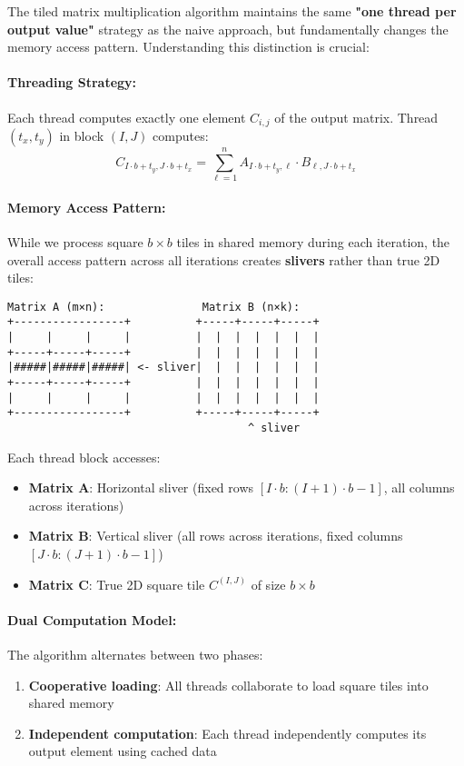 \documentclass{amsbook}
\theoremstyle{definition}
\begin{document}
The tiled matrix multiplication algorithm maintains the same \textbf{"one thread per output value"} strategy as the naive approach, but fundamentally changes the memory access pattern. Understanding this distinction is crucial:

\paragraph{Threading Strategy:} Each thread computes exactly one element $C_{i,j}$ of the output matrix. Thread $(t_x, t_y)$ in block $(I, J)$ computes:
\begin{equation}
C_{I \cdot b + t_y, J \cdot b + t_x} = \sum_{\ell=1}^{n} A_{I \cdot b + t_y, \ell} \cdot B_{\ell, J \cdot b + t_x}
\end{equation}

\paragraph{Memory Access Pattern:} While we process square $b \times b$ tiles in shared memory during each iteration, the overall access pattern across all iterations creates \textbf{slivers} rather than true 2D tiles:

\begin{center}
\begin{verbatim}
Matrix A (m×n):               Matrix B (n×k):
+-----------------+          +-----+-----+-----+
|     |     |     |          |  |  |  |  |  |  |
+-----+-----+-----+          |  |  |  |  |  |  |
|#####|#####|#####| <- sliver|  |  |  |  |  |  |
+-----+-----+-----+          |  |  |  |  |  |  |
|     |     |     |          |  |  |  |  |  |  |
+-----------------+          +-----+-----+-----+
                                     ^ sliver
\end{verbatim}
\end{center}

Each thread block accesses:
\begin{itemize}
\item \textbf{Matrix A}: Horizontal sliver (fixed rows $[I \cdot b : (I+1) \cdot b - 1]$, all columns across iterations)
\item \textbf{Matrix B}: Vertical sliver (all rows across iterations, fixed columns $[J \cdot b : (J+1) \cdot b - 1]$)
\item \textbf{Matrix C}: True 2D square tile $C^{(I,J)}$ of size $b \times b$
\end{itemize}

\paragraph{Dual Computation Model:} The algorithm alternates between two phases:
\begin{enumerate}
\item \textbf{Cooperative loading}: All threads collaborate to load square tiles into shared memory
\item \textbf{Independent computation}: Each thread independently computes its output element using cached data
\end{enumerate}
\end{document}
